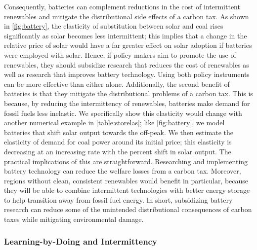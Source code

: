 \documentclass[11pt,a4paper,leqno]{extarticle}
\begin{document}
	
	Consequently, batteries can complement reductions in the cost of intermittent renewables and mitigate the distributional side effects of a carbon tax. As shown in \autoref{fig:battery}, the elasticity of substitution between solar and coal rises significantly as solar becomes less intermittent; this implies that a change in the relative price of solar would have a far greater effect on solar adoption if batteries were employed with solar. Hence, if policy makers aim to promote the use of renewables, they should subsidize research that reduces the cost of renewables as well as research that improves battery technology. Using both policy instruments can be more effective than either alone. Additionally, the second benefit of batteries is that they mitigate the distributional problems of a carbon tax. This is because, by reducing the intermittency of renewables, batteries make demand for fossil fuels less inelastic. We specifically show this elasticity would change with another numerical example in \autoref{table:storelas}; like  \autoref{fig:battery}, we model batteries that shift solar output towards the off-peak. We then estimate the elasticity of demand for coal power around its initial price; this elasticity is decreasing at an increasing rate with the percent shift in solar output. The practical implications of this are straightforward. Researching and implementing battery technology can reduce the welfare losses from a carbon tax. Moreover, regions without clean, consistent renewables would benefit in particular, because they will be able to combine intermittent technologies with better energy storage to help transition away from fossil fuel energy. In short, subsidizing battery research can reduce some of the unintended distributional consequences of carbon taxes while mitigating environmental damage. 
	
	\subsubsection{Learning-by-Doing and Intermittency}
	
\end{document}
